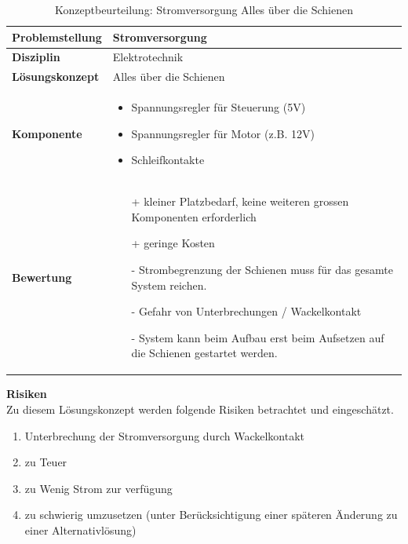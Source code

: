 \documentclass[../../../main.tex]{subfiles}
\begin{document}
    \begin{flushleft}
        \begin{table}[H]
        \begin{tabular}{ | l | p{11cm} |}
        \hline
        \textbf{Problemstellung} & Stromversorgung \\ \hline
        \textbf{Disziplin} & Elektrotechnik \\ \hline
        \textbf{Lösungskonzept} & Alles über die Schienen\\ \hline
        \textbf{Komponente} & \begin{itemize}
            \item Spannungsregler für Steuerung (5V)
            \item Spannungsregler für Motor (z.B. 12V)
            \item Schleifkontakte
            \end{itemize}\\ \hline
        \textbf{Bewertung} &  \begin{itemize}
                                \item[+] kleiner Platzbedarf, keine weiteren grossen Komponenten erforderlich
                                \item[+] geringe Kosten
                                \item[-] Strombegrenzung der Schienen muss für das gesamte System reichen.
                                \item[-] Gefahr von Unterbrechungen / Wackelkontakt
                                \item[-] System kann beim Aufbau erst beim Aufsetzen auf die Schienen gestartet werden. 
                              \end{itemize} \\ \hline
        \end{tabular}
        \caption{Konzeptbeurteilung: Stromversorgung Alles über die Schienen}
        \label{tab:strom_konzept_schienen}
    \end{table}
    \end{flushleft}

    \textbf{Risiken}\\
    Zu diesem Lösungskonzept werden folgende Risiken betrachtet und eingeschätzt.
    \begin{enumerate}[I]
        \item Unterbrechung der Stromversorgung durch Wackelkontakt
        \item zu Teuer
        \item zu Wenig Strom zur verfügung
        \item zu schwierig umzusetzen (unter Berücksichtigung einer späteren Änderung zu einer Alternativlösung)
    \end{enumerate}
\end{document}
